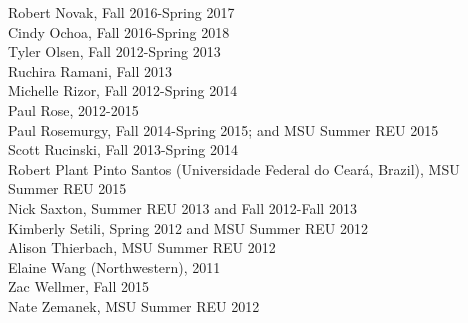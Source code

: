 \documentclass[9pt]{extarticle}
\begin{document}
Robert Novak, Fall 2016-Spring 2017 \\
Cindy Ochoa, Fall 2016-Spring 2018 \\
Tyler Olsen, Fall 2012-Spring 2013 \\
Ruchira Ramani, Fall 2013 \\
Michelle Rizor, Fall 2012-Spring 2014 \\
Paul Rose, 2012-2015 \\
Paul Rosemurgy, Fall 2014-Spring 2015; and MSU Summer REU 2015 \\
Scott Rucinski, Fall 2013-Spring 2014 \\
Robert Plant Pinto Santos (Universidade Federal do Cear\'{a}, Brazil), MSU Summer REU 2015 \\
Nick Saxton, Summer REU 2013 and Fall 2012-Fall 2013 \\
Kimberly Setili, Spring 2012 and MSU Summer REU 2012 \\
Alison Thierbach, MSU Summer REU 2012 \\
Elaine Wang (Northwestern), 2011 \\
Zac Wellmer, Fall 2015 \\
Nate Zemanek, MSU Summer REU 2012 \\
\end{document}
